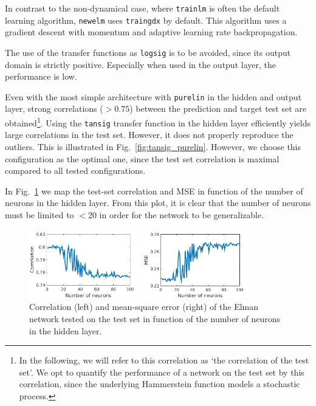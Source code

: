 \documentclass[pdftex,11pt,a4paper]{article}
\begin{document}
In contrast to the non-dynamical case, where \texttt{trainlm} is often the default learning algorithm, \texttt{newelm} uses \texttt{traingdx} by default. This algorithm uses a gradient descent with momentum and adaptive learning rate backpropagation.

The use of the transfer functions as \texttt{logsig} is to be avoided, since its output domain is strictly positive. Especially when used in the output layer, the performance is low.

Even with the most simple architecture with \texttt{purelin} in the hidden and output layer, strong correlations ($>0.75$) between the prediction and target test set are obtained\footnote{In the following, we will refer to this correlation as `the correlation of the test set'. We opt to quantify the performance of a network on the test set by this correlation, since the underlying Hammerstein function models a stochastic process.}. Using the \texttt{tansig} transfer function in the hidden layer efficiently yields large correlations in the test set. However, it does not properly reproduce the outliers. This is illustrated in Fig.~\ref{fig:tansig_purelin}. However, we choose this configuration as the optimal one, since the test set correlation is maximal compared to all tested configurations.

In Fig.~\ref{fig:elman} we map the test-set correlation and MSE in function of the number of neurons in the hidden layer. From this plot, it is clear that the number of neurons must be limited to $< 20$ in order for the network to be generalizable.

\begin{figure}[htb]
\centering
\begin{minipage}{0.4\textwidth}
\includegraphics[height=3cm]{figs/correlation_map.png}
\end{minipage}%
\begin{minipage}{0.4\textwidth}
\includegraphics[height=3cm]{figs/mse_map.png}
\end{minipage}%
\caption{Correlation (left) and mean-square error (right) of the Elman network tested on the test set in function of the number of neurons in the hidden layer. \label{fig:elman}}
\end{figure}
\end{document}
